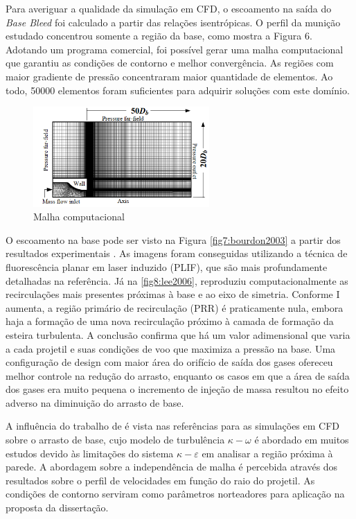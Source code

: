 Para averiguar a qualidade da simulação em CFD, o escoamento na saída do \textit{Base Bleed} foi calculado a partir das relações isentrópicas. O perfil da munição estudado concentrou somente a região da base, como mostra a Figura 6. Adotando um programa comercial, foi possível gerar uma malha computacional que garantiu as condições de contorno e melhor convergência. As regiões com maior gradiente de pressão concentraram maior quantidade de elementos. Ao todo, \num{50000} elementos foram suficientes para adquirir soluções com este domínio.

\begin{figure}[!ht]
	\centering
	\includegraphics[width=0.6\textwidth]{foto06-malha-lee&kim.png}
	\caption[Malha computacional]{Malha computacional \cite{Lee2006Sep}}
	\label{fig6:lee2006}
\end{figure}
	
O escoamento na base pode ser visto na Figura \ref{fig7:bourdon2003} a partir dos resultados experimentais \cite{Bourdon2003Feb}. As imagens foram conseguidas utilizando a técnica de fluorescência planar em laser induzido (PLIF), que são mais profundamente detalhadas na referência. Já na \autoref{fig8:lee2006}, \citeauthor{Lee2006Sep} reproduziu computacionalmente as recirculações mais presentes próximas à base e ao eixo de simetria. Conforme I aumenta, a região primário de recirculação (PRR) é praticamente nula, embora haja a formação de uma nova recirculação próximo à camada de formação da esteira turbulenta. A conclusão confirma que há um valor adimensional que varia a cada projetil e suas condições de voo que maximiza a pressão na base. Uma configuração de design com maior área do orifício de saída dos gases ofereceu melhor controle na redução do arrasto, enquanto os casos em que a área de saída dos gases era muito pequena o incremento de injeção de massa resultou no efeito adverso na diminuição do arrasto de base. 

A influência do trabalho de \citeauthor{Lee2006Sep} é vista nas referências para as simulações em CFD sobre o arrasto de base, cujo modelo de turbulência \(\kappa-\omega\) é abordado em muitos estudos devido às limitações do sistema \(\kappa-\varepsilon\) em analisar a região próxima à parede. A abordagem sobre a independência de malha é percebida através dos resultados sobre o perfil de velocidades em função do raio do projetil. As condições de contorno serviram como parâmetros norteadores para aplicação na proposta da dissertação.

